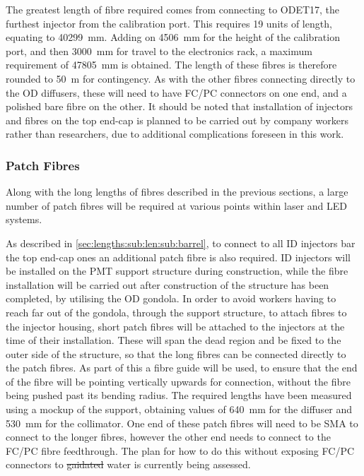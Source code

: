 \documentclass[a4paper,11pt]{article}
\providecommand{\DIFaddtex}[1]{{\protect\color{blue}\uwave{#1}}} %
\providecommand{\DIFdeltex}[1]{{\protect\color{red}\sout{#1}}}                      %
\providecommand{\DIFaddbegin}{} %
\providecommand{\DIFaddend}{} %
\providecommand{\DIFdelbegin}{} %
\providecommand{\DIFdelend}{} %
\providecommand{\DIFadd}[1]{\texorpdfstring{\DIFaddtex{#1}}{#1}} %
\providecommand{\DIFdel}[1]{\texorpdfstring{\DIFdeltex{#1}}{}} %
\newcommand{\DIFscaledelfig}{0.5}
\newlength{\DIFdelgraphicswidth} %
\newlength{\DIFdelgraphicsheight} %
\newcommand{\DIFaddincludegraphics}[2][]{{\color{blue}\fbox{\DIFOincludegraphics[#1]{#2}}}} %
\newcommand{\DIFdelincludegraphics}[2][]{%
\sbox{\DIFdelgraphicsbox}{\DIFOincludegraphics[#1]{#2}}%
\settoboxwidth{\DIFdelgraphicswidth}{\DIFdelgraphicsbox} %
\settoboxtotalheight{\DIFdelgraphicsheight}{\DIFdelgraphicsbox} %
\scalebox{\DIFscaledelfig}{%
\parbox[b]{\DIFdelgraphicswidth}{\usebox{\DIFdelgraphicsbox}\\[-\baselineskip] \rule{\DIFdelgraphicswidth}{0em}}\llap{\resizebox{\DIFdelgraphicswidth}{\DIFdelgraphicsheight}{%
\setlength{\unitlength}{\DIFdelgraphicswidth}%
\begin{picture}(1,1)%
\thicklines\linethickness{2pt} %
{\color[rgb]{1,0,0}\put(0,0){\framebox(1,1){}}}%
{\color[rgb]{1,0,0}\put(0,0){\line( 1,1){1}}}%
{\color[rgb]{1,0,0}\put(0,1){\line(1,-1){1}}}%
\end{picture}%
}\hspace*{3pt}}} %
} %
\DeclareRobustCommand{\DIFaddbegin}{\DIFOaddbegin \let\includegraphics\DIFaddincludegraphics} %
\DeclareRobustCommand{\DIFaddend}{\DIFOaddend \let\includegraphics\DIFOincludegraphics} %
\DeclareRobustCommand{\DIFdelbegin}{\DIFOdelbegin \let\includegraphics\DIFdelincludegraphics} %
\DeclareRobustCommand{\DIFdelend}{\DIFOaddend \let\includegraphics\DIFOincludegraphics} %
\begin{document}
The greatest length of fibre required comes from connecting to ODET17, the furthest injector from the calibration port. This requires 19 units of length, equating to 40299~mm. Adding on 4506~mm for the height of the calibration port, and then 3000~mm for travel to the electronics rack, a maximum requirement of 47805~mm is obtained. The length of these fibres is therefore rounded to 50~m for contingency. As with the other fibres connecting directly to the OD diffusers, these will need to have FC/PC connectors on one end, and a polished bare fibre on the other. It should be noted that installation of injectors and fibres on the top end-cap is planned to be carried out by company workers rather than researchers, due to additional complications foreseen in this work.


\subsubsection{Patch Fibres}\label{sec:lengths:sub:len:sub:patch}

Along with the long lengths of fibres described in the previous sections, a large number of patch fibres will be required at various points within laser and LED systems.

As described in \cref{sec:lengths:sub:len:sub:barrel}, to connect to all ID injectors bar the top end-cap ones an additional patch fibre is also required. ID injectors will be installed on the PMT support structure during construction, while the fibre installation will be carried out after construction of the structure has been completed, by utilising the OD gondola. In order to avoid workers having to reach far out of the gondola, through the support structure, to attach fibres to the injector housing, short patch fibres will be attached to the injectors at the time of their installation. These will span the dead region and be fixed to the outer side of the structure, so that the long fibres can be connected directly to the patch fibres. As part of this a fibre guide will be used, to ensure that the end of the fibre will be pointing vertically upwards for connection, without the fibre being pushed past its bending radius. The required lengths have been measured using a mockup of the support, obtaining values of 640~mm for the diffuser and 530~mm for the collimator. One end of these patch fibres will need to be SMA to connect to the longer fibres, however the other end needs to connect to the FC/PC fibre feedthrough. The plan for how to do this without exposing FC/PC connectors to \DIFdelbegin \DIFdel{gaidated }\DIFdelend \DIFaddbegin \DIFadd{gadiated }\DIFaddend water is currently being assessed.
\end{document}
